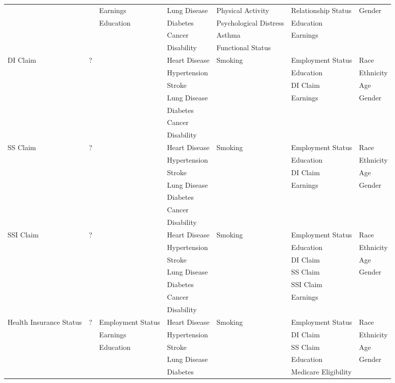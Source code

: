 \begin{table}
\begin{tiny}
\begin{tabular}{lllllll}
& & Earnings & Lung Disease &  Physical Activity & Relationship Status & Gender \\
& & Education & Diabetes & Psychological Distress & Education & \\
& & & Cancer & Asthma & Earnings & \\
& & & Disability & Functional Status & & \\
\midrule			
DI Claim & ?& & Heart Disease & Smoking & Employment Status& Race \\
& & & Hypertension & & Education & Ethnicity \\
& & & Stroke &  & DI Claim & Age \\
& & & Lung Disease &  & Earnings & Gender \\
& & & Diabetes & & & \\
& & & Cancer & & & \\
& & & Disability & & & \\
\midrule			
SS Claim & ? &  & Heart Disease & Smoking & Employment Status & Race \\
& & & Hypertension & & Education & Ethnicity \\
& & & Stroke & & DI Claim & Age \\
& & & Lung Disease & & Earnings & Gender \\
& & & Diabetes & & & \\
& & & Cancer & & & \\
& & & Disability & & & \\
\midrule			
SSI Claim & ? & & Heart Disease & Smoking & Employment Status & Race \\
& & & Hypertension & & Education & Ethnicity \\
& & & Stroke & & DI Claim & Age \\
& & & Lung Disease & & SS Claim & Gender \\
& & & Diabetes & & SSI Claim & \\
& & & Cancer & & Earnings & \\
& & & Disability & & & \\
\midrule			
Health Insurance Status & ?&  Employment Status & Heart Disease & Smoking & Employment Status & Race \\
& & Earnings & Hypertension & & DI Claim & Ethnicity \\
& & Education & Stroke & & SS Claim & Age \\
& & & Lung Disease & & Education & Gender \\
& & & Diabetes & & Medicare Eligibility & \\

\end{tabular}
\end{tiny}
\end{table}
